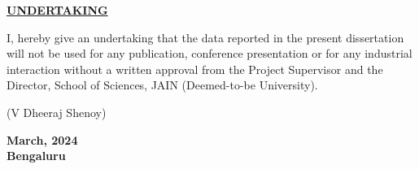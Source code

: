
\thispagestyle{empty}

\begin{center}

    \Large{\underline{\textbf{UNDERTAKING}}}\\

\end{center}
\vspace{1.5cm}

\noindent

I, \textbf{\auth{}} hereby give an undertaking that the data
reported in the present dissertation will not be used for any publication, conference
presentation or for any industrial interaction without a written approval from the Project
Supervisor and the Director, School of Sciences, JAIN (Deemed-to-be University).

\vspace{5cm}

\noindent
\begin{minipage}{0.5\textwidth}

    (V Dheeraj Shenoy)

    \vspace{1.5cm}

\end{minipage}%
\begin{minipage}{0.5\textwidth}
    \flushright

    \textbf{March, 2024\\
      Bengaluru}
\end{minipage}

